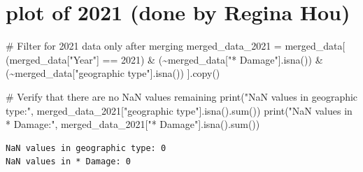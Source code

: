 \documentclass[
  letterpaper,
  DIV=11,
  numbers=noendperiod]{scrartcl}
\newenvironment{Shaded}{\begin{snugshade}}{\end{snugshade}}
\newcommand{\BuiltInTok}[1]{\textcolor[rgb]{0.00,0.23,0.31}{#1}}
\newcommand{\CommentTok}[1]{\textcolor[rgb]{0.37,0.37,0.37}{#1}}
\newcommand{\DecValTok}[1]{\textcolor[rgb]{0.68,0.00,0.00}{#1}}
\newcommand{\NormalTok}[1]{\textcolor[rgb]{0.00,0.23,0.31}{#1}}
\newcommand{\OperatorTok}[1]{\textcolor[rgb]{0.37,0.37,0.37}{#1}}
\newcommand{\StringTok}[1]{\textcolor[rgb]{0.13,0.47,0.30}{#1}}
\begin{document}
\section{plot of 2021 (done by Regina
Hou)}\label{plot-of-2021-done-by-regina-hou}

\begin{Shaded}
\begin{Highlighting}[]
\CommentTok{\# Filter for 2021 data only after merging}
\NormalTok{merged\_data\_2021 }\OperatorTok{=}\NormalTok{ merged\_data[}
\NormalTok{    (merged\_data[}\StringTok{"Year"}\NormalTok{] }\OperatorTok{==} \DecValTok{2021}\NormalTok{) }\OperatorTok{\&} 
\NormalTok{    (}\OperatorTok{\textasciitilde{}}\NormalTok{merged\_data[}\StringTok{"* Damage"}\NormalTok{].isna()) }\OperatorTok{\&} 
\NormalTok{    (}\OperatorTok{\textasciitilde{}}\NormalTok{merged\_data[}\StringTok{"geographic type"}\NormalTok{].isna())}
\NormalTok{].copy()}

\CommentTok{\# Verify that there are no NaN values remaining}
\BuiltInTok{print}\NormalTok{(}\StringTok{"NaN values in geographic type:"}\NormalTok{, merged\_data\_2021[}\StringTok{"geographic type"}\NormalTok{].isna().}\BuiltInTok{sum}\NormalTok{())}
\BuiltInTok{print}\NormalTok{(}\StringTok{"NaN values in * Damage:"}\NormalTok{, merged\_data\_2021[}\StringTok{"* Damage"}\NormalTok{].isna().}\BuiltInTok{sum}\NormalTok{())}
\end{Highlighting}
\end{Shaded}

\begin{verbatim}
NaN values in geographic type: 0
NaN values in * Damage: 0
\end{verbatim}
\end{document}
